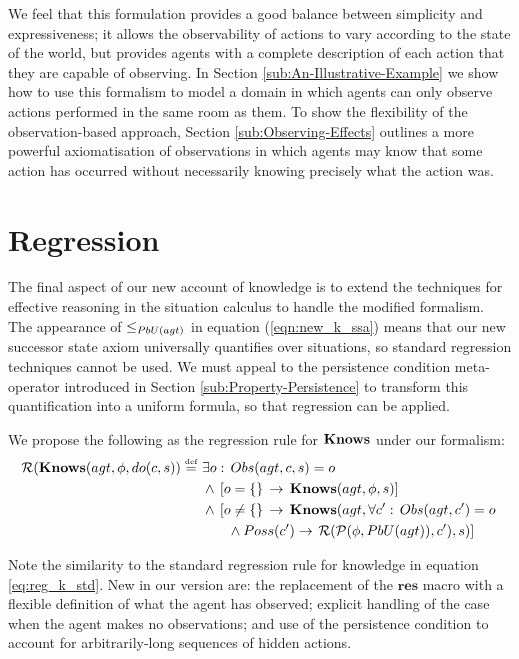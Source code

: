 We feel that this formulation provides a good balance between simplicity
and expressiveness; it allows the observability of actions to vary
according to the state of the world, but provides agents with a complete
description of each action that they are capable of observing. In
Section \ref{sub:An-Illustrative-Example} we show how to use this
formalism to model a domain in which agents can only observe actions
performed in the same room as them. To show the flexibility of the
observation-based approach, Section \ref{sub:Observing-Effects} outlines
a more powerful axiomatisation of observations in which agents may
know that some action has occurred without necessarily knowing precisely
what the action was.


\section{Regression}

The final aspect of our new account of knowledge is to extend the
techniques for effective reasoning in the situation calculus to handle
the modified formalism. The appearance of $\leq_{PbU(agt)}$ in equation
(\ref{eqn:new_k_ssa}) means that our new successor state axiom universally
quantifies over situations, so standard regression techniques cannot
be used. We must appeal to the persistence condition meta-operator
introduced in Section \ref{sub:Property-Persistence} to transform
this quantification into a uniform formula, so that regression can
be applied.

We propose the following as the regression rule for $\mathbf{Knows}$ under
our formalism:\begin{align}
\mathcal{R}(\mathbf{Knows}(agt,\phi,do(c,s))\stackrel{\mbox{\tiny def}}{=}\,\, & \exists o:\, Obs(agt,c,s)=o\nonumber \\
 & \wedge\,\left[o=\{\}\,\rightarrow\,\mathbf{Knows}(agt,\phi,s)\right]\nonumber \\
 & \wedge\,\left[o\neq\{\}\,\rightarrow\,\mathbf{Knows}(agt,\forall c':\, Obs(agt,c')=o\right.\nonumber \\
 & \,\,\,\,\,\,\,\,\,\,\,\wedge Poss(c')\rightarrow\left.\mathcal{R}(\mathcal{P}(\phi,PbU(agt)),c'),s)\right]\label{eqn:R_do_c_s}\end{align}


Note the similarity to the standard regression rule for knowledge
in equation \eqref{eq:reg_k_std}. New in our version are: the replacement
of the $\mathbf{res}$ macro with a flexible definition of what the
agent has observed; explicit handling of the case when the agent makes
no observations; and use of the persistence condition to account for
arbitrarily-long sequences of hidden actions.


